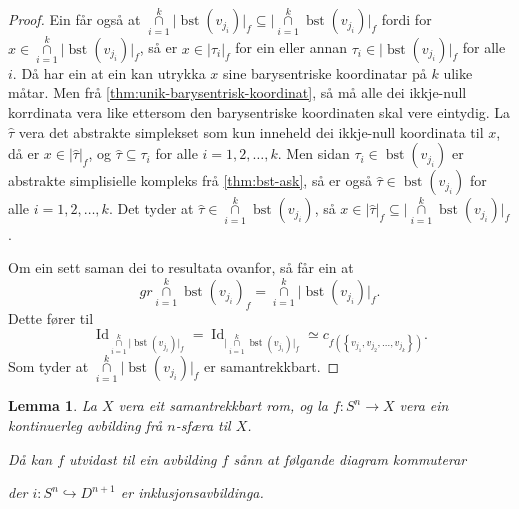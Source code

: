 \documentclass[a4paper, 12pt, norsk]{article}
\theoremstyle{plain}
\newtheorem{lemma}[theorem]{Lemma}
\theoremstyle{definition}
\newcommand{\intersect}{ \mathop{\cap}\limits }
\newcommand{\gr}[1]{ \lvert #1 \rvert } %
\newcommand{\set}[1]{ \left\{ #1 \right\} } %
\DeclareMathOperator{\bst}{bst} %
\DeclareMathOperator{\Id}{Id} %
\begin{document}
\begin{proof}
	Ein får også at \( \intersect_{i = 1}^k \gr{\bst(v_{j_i})}_f \subseteq \gr{\intersect_{i = 1}^k \bst(v_{j_i})}_f \) fordi for \( x \in \intersect_{i = 1}^k \gr{\bst(v_{j_i})}_f \), så er \( x \in \gr{\tau_i}_f \) for ein eller annan \( \tau_i \in \gr{\bst(v_{j_i})}_f \) for alle \( i \). Då har ein at ein kan utrykka \( x \) sine barysentriske koordinatar på \( k \) ulike måtar. Men frå \autoref{thm:unik-barysentrisk-koordinat}, så må alle dei ikkje-null korrdinata vera like ettersom den barysentriske koordinaten skal vere eintydig. La \( \hat{\tau} \) vera det abstrakte simplekset som kun inneheld dei ikkje-null koordinata til \( x \), då er \( x \in \gr{\hat{\tau}}_f \), og \( \hat{\tau} \subseteq \tau_i \) for alle \( i = 1, 2, \dots, k \). Men sidan \( \tau_i \in \bst(v_{j_i}) \) er abstrakte simplisielle kompleks frå \autoref{thm:bst-ask}, så er også \( \hat{\tau} \in  \bst(v_{j_i}) \) for alle \( i = 1, 2, \dots, k \). Det tyder at \( \hat{\tau} \in \intersect_{i = 1}^k \bst(v_{j_i}) \), så \( x \in \gr{\hat{\tau}}_f \subseteq \gr{\intersect_{i = 1}^k \bst(v_{j_i})}_f \).
	
	Om ein sett saman dei to resultata ovanfor, så får ein at
	\[
		gr{\intersect_{i = 1}^k \bst(v_{j_i})}_f = \intersect_{i = 1}^k \gr{\bst(v_{j_i})}_f.
	\]
	Dette fører til
	\[ 
		\Id_{\intersect_{i = 1}^k \gr{\bst(v_{j_i})}_f} = \Id_{\gr{\intersect_{i = 1}^k \bst(v_{j_i})}_f} \simeq c_{f(\set{v_{j_1}, v_{j_2}, \dots, v_{j_k}})}.
	\]
	Som tyder at \( \intersect_{i = 1}^k \gr{\bst(v_{j_i})}_f \) er samantrekkbart.
\end{proof}

\begin{lemma} \label{thm:utvida-avb}
	La \( X \) vera eit samantrekkbart rom, og la \( f: S^n \to X \) vera ein kontinuerleg avbilding frå \( n \)-sfæra til \( X \). 
	
	Då kan \( f \) utvidast til ein avbilding \( \hat{f} \) sånn at følgande diagram kommuterar

	\begin{center}
	\end{center}
	der \( i: S^n \hookrightarrow D^{n+1} \) er inklusjonsavbildinga.
\end{lemma}
\end{document}
